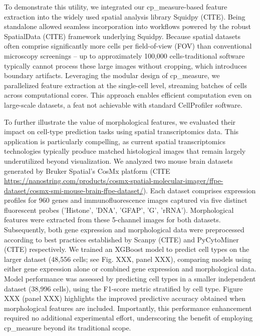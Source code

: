 \documentclass{article}
\begin{document}
To demonstrate this utility, we integrated our cp\_measure-based feature extraction into the widely used spatial analysis library Squidpy (CITE). Being standalone allowed seamless incorporation into workflows powered by the robust SpatialData (CITE) framework underlying Squidpy. Because spatial datasets often comprise significantly more cells per field-of-view (FOV) than conventional microscopy screenings -- up to approximately 100,000 cells-traditional software typically cannot process these large images without cropping, which introduces boundary artifacts. Leveraging the modular design of cp\_measure, we parallelized feature extraction at the single-cell level, streaming batches of cells across computational cores. This approach enables efficient computation even on large-scale datasets, a feat not achievable with standard CellProfiler software.

To further illustrate the value of morphological features, we evaluated their impact on cell-type prediction tasks using spatial transcriptomics data. This application is particularly compelling, as current spatial transcriptomics technologies typically produce matched histological images that remain largely underutilized beyond visualization. We analyzed two mouse brain datasets generated by Bruker Spatial's CosMx platform (CITE \url{https://nanostring.com/products/cosmx-spatial-molecular-imager/ffpe-dataset/cosmx-smi-mouse-brain-ffpe-dataset/}). Each dataset comprises expression profiles for 960 genes and immunofluorescence images captured via five distinct fluorescent probes ('Histone', 'DNA', 'GFAP', 'G', 'rRNA'). Morphological features were extracted from these 5-channel images for both datasets. Subsequently, both gene expression and morphological data were preprocessed according to best practices established by Scanpy (CITE) and PyCytoMiner (CITE) respectively. We trained an XGBoost model to predict cell types on the larger dataset (48,556 cells; see Fig. XXX, panel XXX), comparing models using either gene expression alone or combined gene expression and morphological data. Model performance was assessed by predicting cell types in a smaller independent dataset (38,996 cells), using the F1-score metric stratified by cell type. Figure XXX (panel XXX) highlights the improved predictive accuracy obtained when morphological features are included. Importantly, this performance enhancement required no additional experimental effort, underscoring the benefit of employing cp\_measure beyond its traditional scope.
\end{document}
